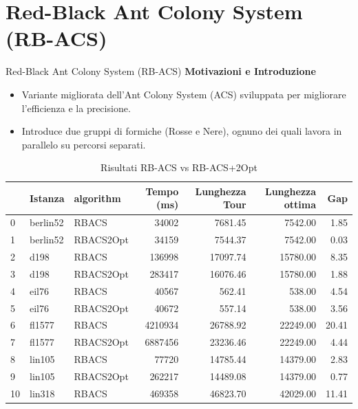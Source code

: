 \documentclass{beamer}
\begin{document}
\section{Red-Black Ant Colony System (RB-ACS)}
\begin{frame}{Red-Black Ant Colony System (RB-ACS)}
    \textbf{Motivazioni e Introduzione}
    \begin{itemize}
        \item Variante migliorata dell'Ant Colony System (ACS) sviluppata per migliorare l’efficienza e la precisione.
        \item Introduce due gruppi di formiche (Rosse e Nere), ognuno dei quali lavora in parallelo su percorsi separati.
    \end{itemize}

    \begin{table}[H]
        \centering
        \caption{Risultati RB-ACS vs RB-ACS+2Opt}
        \begin{tabular}{lllrrrr}
            \toprule
               & Istanza  & algorithm & Tempo (ms) & Lunghezza Tour & Lunghezza ottima & Gap   \\
            \midrule
            0  & berlin52 & RBACS     & 34002      & 7681.45        & 7542.00          & 1.85  \\
            1  & berlin52 & RBACS2Opt & 34159      & 7544.37        & 7542.00          & 0.03  \\
            2  & d198     & RBACS     & 136998     & 17097.74       & 15780.00         & 8.35  \\
            3  & d198     & RBACS2Opt & 283417     & 16076.46       & 15780.00         & 1.88  \\
            4  & eil76    & RBACS     & 40567      & 562.41         & 538.00           & 4.54  \\
            5  & eil76    & RBACS2Opt & 40672      & 557.14         & 538.00           & 3.56  \\
            6  & fl1577   & RBACS     & 4210934    & 26788.92       & 22249.00         & 20.41 \\
            7  & fl1577   & RBACS2Opt & 6887456    & 23236.46       & 22249.00         & 4.44  \\
            8  & lin105   & RBACS     & 77720      & 14785.44       & 14379.00         & 2.83  \\
            9  & lin105   & RBACS2Opt & 262217     & 14489.08       & 14379.00         & 0.77  \\
            10 & lin318   & RBACS     & 469358     & 46823.70       & 42029.00         & 11.41 \\

\end{tabular}
\end{table}
\end{frame}
\end{document}
